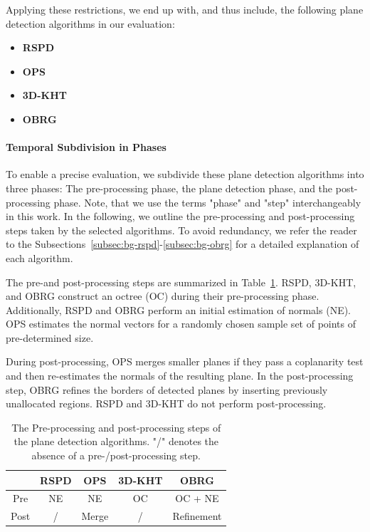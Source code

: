 \documentclass[main.tex]{subfiles}
\begin{document}
Applying these restrictions, we end up with, and thus include, the following plane detection algorithms in our evaluation:

\begin{itemize}
    \item \textbf{RSPD}
    \item \textbf{OPS}
    \item \textbf{3D-KHT}
    \item \textbf{OBRG}
\end{itemize}

\paragraph{Temporal Subdivision in Phases}
\label{par:prepostalgos}
To enable a precise evaluation, we subdivide these plane detection algorithms into three phases:
The pre-processing phase, the plane detection phase, and the post-processing phase. Note, that
we use the terms "phase" and "step" interchangeably in this work. In the following, we outline
the pre-processing and post-processing steps taken by the selected algorithms. To avoid redundancy,
we refer the reader to the Subsections~\ref{subsec:bg-rspd}-\ref{subsec:bg-obrg} for a detailed explanation of each
algorithm.

The pre-and post-processing steps are summarized in Table~\ref{tab:pre-post}.
RSPD, 3D-KHT, and OBRG construct an octree (OC) during their pre-processing phase.
Additionally, RSPD and OBRG perform an initial estimation of normals (NE).
OPS estimates the normal vectors for a randomly chosen sample set of points of pre-determined size.

During post-processing, OPS merges smaller planes if they pass a coplanarity test and then re-estimates the normals of the
resulting plane. In the post-processing step, OBRG refines the borders of detected planes by inserting
previously unallocated regions. RSPD and 3D-KHT do not perform post-processing.


\begin{table}[H]
    \centering
    \begin{tabular}{c|cccc}
             & RSPD & OPS   & 3D-KHT & OBRG       \\ \hline
        Pre  & NE   & NE    & OC     & OC + NE    \\
        Post & /    & Merge & /      & Refinement
    \end{tabular}
    \caption{The Pre-processing and post-processing steps of the plane detection algorithms. "/" denotes the absence of
        a pre-/post-processing step.}
    \label{tab:pre-post}
\end{table}
\end{document}
